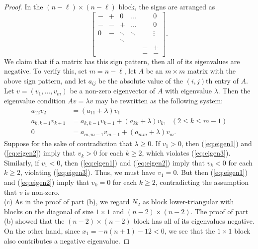 \documentclass[11pt]{article}
\theoremstyle{definition}
\numberwithin{equation}{section}
\begin{document}
\begin{proof}
     \indent In the $(n-\ell) \times (n - \ell)$ block, the signs are arranged as
    \begin{equation*}
    \begin{bmatrix}
    - & + & 0   & \dots  &   & 0   \\
    - & -       & +   & \dots  &   & 0   \\
    0  &     -    & \ddots         & \ddots  &  & \vdots    \\
    & & \ddots & & & \\
      &         &      &     &     -      & +   \\
      &         &      &     &     -     & -
  \end{bmatrix}.
\end{equation*}
We claim that  if a matrix has this sign pattern, then all of its eigenvalues are negative.  To verify this, set $m = n-\ell$, let $A$ be an $m \times m$ matrix with the above sign pattern, and let $a_{ij}$ be the absolute value of the $(i,j)$th entry of $A$.  Let $v = (v_1, \ldots, v_m)$ be a non-zero eigenvector of $A$ with eigenvalue $\lambda$.  Then the eigenvalue condition $Av = \lambda v$ may be rewritten as the following system:
    \begin{align}
    a_{12}v_2 & = \left( a_{11} + \lambda \right) v_1 \label{eq:eigen1} \\
    a_{k,k+1}v_{k+1} & = a_{k,k-1}v_{k-1} + \left(a_{kk} + \lambda \right) v_k, \ \ \ (2 \leq k \leq m-1) \label{eq:eigen2} \\
    0 & = a_{m,m-1} v_{m-1} + \left( a_{mm} + \lambda \right) v_m. \label{eq:eigen3}
\end{align}
Suppose for the sake of contradiction that $\lambda \geq 0$.  If $v_1 > 0$, then (\ref{eq:eigen1}) and (\ref{eq:eigen2}) imply that $v_k > 0$ for each $k \geq 2$, which violates (\ref{eq:eigen3}).  Similarly, if $v_1 < 0$, then (\ref{eq:eigen1}) and (\ref{eq:eigen2}) imply that $v_k < 0$ for each $k \geq 2$, violating (\ref{eq:eigen3}).  Thus, we must have $v_1 = 0$.  But then (\ref{eq:eigen1}) and (\ref{eq:eigen2}) imply that $v_k = 0$ for each $k \geq 2$, contradicting the assumption that $v$ is non-zero.  \\
    
   (c) As in the proof of part (b), we regard $N_2$ as block lower-triangular with blocks on the diagonal of size $1 \times 1$ and $(n-2) \times (n-2)$.  The proof of part (b) showed that the $(n-2) \times (n-2)$ block has all of its eigenvalues negative.  On the other hand, since $x_1 = -n(n+1) - 12 < 0$, we see that the $1 \times 1$ block also contributes a negative eigenvalue.  
\end{proof}
\end{document}
